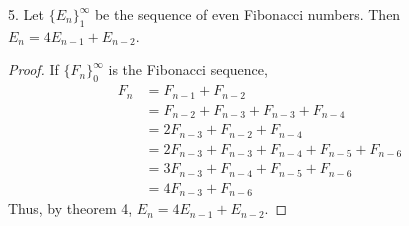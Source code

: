 \documentclass[12pt]{article}
\begin{document}
5. Let $\{E_n\}_1^{\infty}$ be the sequence of even Fibonacci numbers. Then
$E_n = 4E_{n-1} + E_{n-2}$.
\begin{proof}
  If $\{F_n\}_0^{\infty}$ is the Fibonacci sequence,
  \begin{align*}
    F_n &= F_{n-1} + F_{n-2}\\
        &= F_{n-2} + F_{n-3} + F_{n-3} + F_{n-4}\\
        &= 2F_{n-3} + F_{n-2} + F_{n-4}\\
        &= 2F_{n-3} + F_{n-3} + F_{n-4} + F_{n-5} + F_{n-6}\\
        &= 3F_{n-3} + F_{n-4} + F_{n-5} + F_{n-6}\\
        &= 4F_{n-3} + F_{n-6}
  \end{align*}
  Thus, by theorem 4, $E_n = 4E_{n-1} + E_{n-2}$.
\end{proof}
\end{document}

